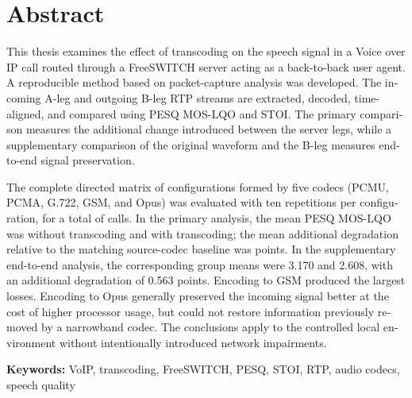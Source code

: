 \chapter*{Abstract}
\begin{otherlanguage}{english}

This thesis examines the effect of transcoding on the speech signal in a Voice over IP call routed through a FreeSWITCH server acting as a back-to-back user agent. A reproducible method based on packet-capture analysis was developed. The incoming A-leg and outgoing B-leg RTP streams are extracted, decoded, time-aligned, and compared using PESQ MOS-LQO and STOI. The primary comparison measures the additional change introduced between the server legs, while a supplementary comparison of the original waveform and the B-leg measures end-to-end signal preservation.

The complete directed matrix of \BrojKonfiguracija{} configurations formed by five codecs (PCMU, PCMA, G.722, GSM, and Opus) was evaluated with ten repetitions per configuration, for a total of \BrojPoziva{} calls. In the primary analysis, the mean PESQ MOS-LQO was \PassthroughPESQEnglish{} without transcoding and \TranscodePESQEnglish{} with transcoding; the mean additional degradation relative to the matching source-codec baseline was \RazlikaPESQEnglish{} points. In the supplementary end-to-end analysis, the corresponding group means were 3.170 and 2.608, with an additional degradation of 0.563 points. Encoding to GSM produced the largest losses. Encoding to Opus generally preserved the incoming signal better at the cost of higher processor usage, but could not restore information previously removed by a narrowband codec. The conclusions apply to the controlled local environment without intentionally introduced network impairments.

\textbf{Keywords:} VoIP, transcoding, FreeSWITCH, PESQ, STOI, RTP, audio codecs, speech quality
\end{otherlanguage}
